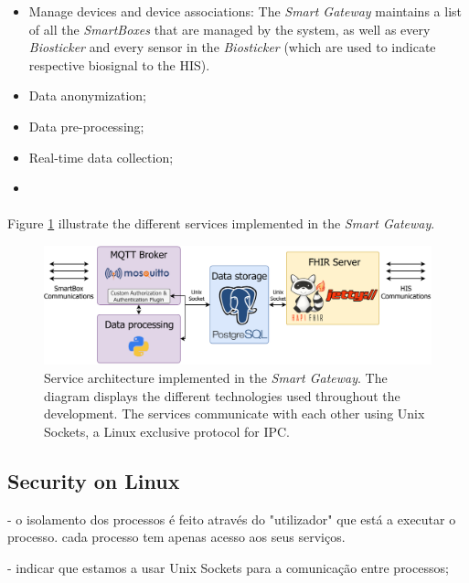 \begin{itemize}
    \item Manage devices and device associations: The \textit{Smart Gateway} maintains a list of all the \textit{SmartBoxes} that are managed by the system, as well as every \textit{Biosticker} and every sensor in the \textit{Biosticker} (which are used to indicate respective biosignal to the \acs{HIS}). 
    \item Data anonymization;
    \item Data pre-processing;
    \item Real-time data collection;
    \item 
\end{itemize}

\paragraph{} Figure \ref{fig:gateway_serviceoverview} illustrate the different services implemented in the \textit{Smart Gateway}.

\begin{figure}[H]
    \centering
    \includegraphics[width=\linewidth]{images/service overview gateway.pdf}
    \caption[Service architecture implemented in the \textit{Smart Gateway}.]{Service architecture implemented in the \textit{Smart Gateway}. The diagram displays the different technologies used throughout the development. The services communicate with each other using Unix Sockets, a Linux exclusive protocol for \acf{IPC}.}
    \label{fig:gateway_serviceoverview}
\end{figure}


\subsection{Security on Linux}
- o isolamento dos processos é feito através do "utilizador" que está a executar o processo. cada processo tem apenas acesso aos seus serviços.

- indicar que estamos a usar Unix Sockets para a comunicação entre processos;

